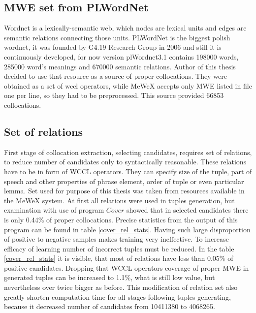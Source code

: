 \subsection{MWE set from PLWordNet}
Wordnet is a lexically-semantic web, which nodes are lexical units and edges are semantic relations connecting those units.
PLWordNet is the biggest polish wordnet, it was founded by G4.19 Research Group in 2006 and still it is continuously developed, 
for now version plWordnet3.1 contains 198000 words, 285000 word's meanings and 670000 semantic relations. Author of this thesis decided to use that resource 
as a source of proper collocations. They were obtained as a set of wccl operators, while MeWeX accepts only MWE listed in file one per line, 
so they had to be preprocessed. This source provided 66853 collocations.

\subsection{Set of relations}
First stage of collocation extraction, selecting candidates, requires set of relations, to reduce number of candidates only to syntactically reasonable. 
These relations have to be in form of WCCL operators. They can specify size of the tuple, part of speech and other properties of phrase element, 
order of tuple or even particular lemma. Set used for purpose of this thesis was taken from resources available in the MeWeX system. 
At first all relations were used in tuples generation, but examination with use of program \(Cover\) showed that in selected candidates 
there is only 0.44\% of proper collocations. Precise statistics from the output of this program can be found in table \ref{cover_rel_stats}.
Having such large disproportion of positive to negative samples makes training very ineffective. To increase efficacy of learning 
number of incorrect tuples must be reduced. In the table \ref{cover_rel_stats} it is visible, that most of relations have less than 0.05\% 
of positive candidates. Dropping that WCCL operators coverage of proper MWE in generated tuples can be increased to 1.1\%, 
what is still low value, but nevertheless over twice bigger as before. This modification of relation set also greatly shorten computation time 
for all stages following tuples generating, because it decreased number of candidates from 10411380 to 4068265.

